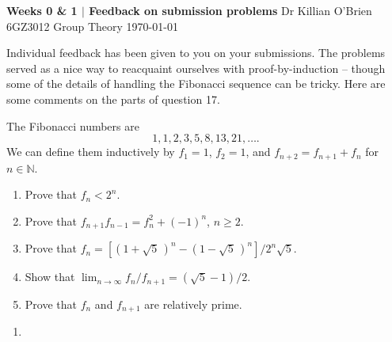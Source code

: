 \documentclass[oneside,10pt]{amsart}
\newcommand{\cbox}[1]{\begin{tcolorbox}[left=0.5mm,right=0.5mm,top=0.5mm,bottom=0.5mm, boxsep=2pt, boxrule=0pt,colback=black]\color{white}\sffamily #1 \end{tcolorbox}}
\newcommand{\tuttitle}[4]{\cbox{\textbf{#1} \hfill {#2}\\{#3} \hfill {\Small #4}}\vskip 4pt}
\begin{document}
\tuttitle{Weeks 0 \& 1 $|$ Feedback on submission problems}{Dr Killian O'Brien}{6GZ3012 Group Theory}{\today}

Individual feedback has been given to you on your submissions. The problems served as a nice way to reacquaint ourselves with proof-by-induction -- though some of the details of handling the Fibonacci sequence can be tricky. Here are some comments on the parts of question 17.

\medskip

The Fibonacci numbers are%
\begin{equation*}
1, 1, 2, 3, 5, 8, 13, 21, \ldots.
\end{equation*}
We can define them inductively by \(f_1 = 1\), \(f_2 = 1\), and \(f_{n + 2} = f_{n + 1} + f_n\) for \(n \in {\mathbb N}\). \leavevmode%
\begin{enumerate}[label=(\alph*)]
\item Prove that \(f_n < 2^n\).%
\item Prove that \(f_{n + 1} f_{n - 1} = f^2_n + (-1)^n\), \(n \geq 2\).%
\item Prove that \(f_n = [(1 + \sqrt{5}\, )^n - (1 - \sqrt{5}\, )^n]/ 2^n \sqrt{5}\).%
\item Show that \(\lim_{n \rightarrow \infty} f_n / f_{n + 1} = (\sqrt{5} - 1)/2\).%
\item Prove that \(f_n\) and \(f_{n + 1}\) are relatively prime.%
\end{enumerate}

\begin{enumerate}[label=(\alph*)]
\item
\end{enumerate}
\end{document}
